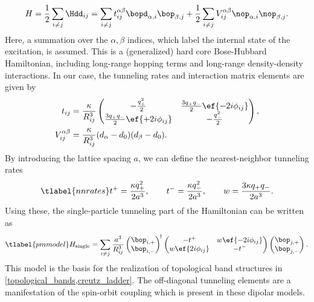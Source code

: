 \begin{align}
    H = \frac{1}{2} \sum_{i\ne j} \Hdd_{ij} = \sum_{i\ne j}  t_{ij}^{\alpha\beta} \bopd_{\alpha,i} \bop_{\beta,j}
    +\frac{1}{2}\sum_{i\ne j} V_{ij}^{\alpha\beta} \nop_{\alpha,i} \nop_{\beta,j}.
\end{align}
Here, a summation over the $\alpha, \beta$ indices, which label the internal state of the excitation, is assumed. This is a (generalized) hard core Bose-Hubbard Hamiltonian, including long-range hopping terms and long-range density-density interactions. In our case, the tunneling rates and interaction matrix elements are given by
\begin{align}
    t_{ij} &= \frac{\kappa}{R_{ij}^3} \begin{pmatrix}
    -\frac{q_+^2}{2} & \frac{3q_+q_-}{2} \ef{-2i \phi_{ij}} \\
    \frac{3q_+q_-}{2} \ef{+2i \phi_{ij}} & -\frac{q_-^2}{2}
\end{pmatrix}, \\
    V_{ij}^{\alpha\beta} &= \frac{\kappa}{R_{ij}^3} (d_\alpha-d_0)(d_\beta-d_0).
\end{align}
By introducing the lattice spacing $a$, we can define the nearest-neighbor tunneling rates
\begin{align} \tlabel{nnrates}
    t^+ = \frac{\kappa q_{+}^2}{2a^3},\qquad
    t^- = \frac{\kappa q_{-}^2}{2a^3},\qquad
    w = \frac{3 \kappa q_{+}q_{-}}{2a^3}.
\end{align}
Using these, the single-particle tunneling part of the Hamiltonian can be written as
\begin{align} \tlabel{pmmodel}
    H_\text{single} = \sum_{i\ne j} \frac{a^3}{R_{ij}^3}
    \begin{pmatrix}
        \bop_{i,+} \\
        \bop_{i,-}
    \end{pmatrix}^{\!\dag}
    \begin{pmatrix}
        -t^+ & w \ef{-2i \phi_{ij}} \\
        w \ef{2i \phi_{ij}} & -t^- \\
    \end{pmatrix}
    \begin{pmatrix}
        \bop_{j,+} \\
        \bop_{j,-}
    \end{pmatrix}^{\vphantom\dag}.
\end{align}
This model is the basis for the realization of topological band structures in \cref{topological_bands,creutz_ladder}. The off-diagonal tunneling elements are a manifestation of the spin-orbit coupling which is present in these dipolar models.



